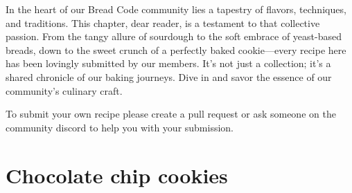 \begin{quoting}
In the heart of our Bread Code community lies a tapestry of flavors,
techniques, and traditions. This chapter, dear reader,
is a testament to that collective passion. From the tangy allure
of sourdough to the soft embrace of yeast-based breads,
down to the sweet crunch of a perfectly baked cookie—every
recipe here has been lovingly submitted by our members.
It's not just a collection; it's a shared chronicle of our baking journeys.
Dive in and savor the essence of our community's culinary craft.

To submit your own recipe please create a pull request or
ask someone on the community discord to help you with
your submission.
\end{quoting}

\section{Chocolate chip cookies}
